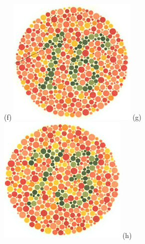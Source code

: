 \documentclass[	12pt, Times, openright, twoside, a4paper, english, brazil]{abntex2}
\begin{document}
\begin{apendicesenv}
\begin{figure}[!htb]
(f)
\endminipage\hfill
{}
\centering
{\includegraphics[width=\linewidth]{ishihara-fuga/plate16.jpg}}
(g)
\endminipage\hfill
{}
\centering
{\includegraphics[width=\linewidth]{ishihara-fuga/plate17.jpg}}
(h)
\endminipage\hfill


\end{figure}
\end{apendicesenv}
\end{document}
